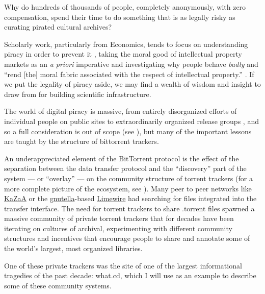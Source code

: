 Why do hundreds of thousands of people, completely anonymously, with
zero compensation, spend their time to do something that is as legally
risky as curating pirated cultural archives?

Scholarly work, particularly from Economics, tends to focus on
understanding piracy in order to prevent it\citep{basamanowiczReleaseGroupsDigital2011, hindujaDeindividuationInternetSoftware2008} , taking the moral good
of intellectual property markets as an \emph{a priori} imperative and
investigating why people behave \emph{badly} and ``rend {[}the{]} moral
fabric associated with the respect of intellectual property.'' \citep{hindujaDeindividuationInternetSoftware2008} . If we put the legality
of piracy aside, we may find a wealth of wisdom and insight to draw from
for building scientific infrastructure.

The world of digital piracy is massive, from entirely disorganized
efforts of individual people on public sites to extraordinarily
organized release groups \citep{basamanowiczReleaseGroupsDigital2011} , and so a full consideration is out of scope (see \citep{eveWarezInfrastructureAesthetics2021} ), but many of the important
lessons are taught by the structure of bittorrent trackers.

An underappreciated element of the BitTorrent protocol is the effect of
the separation between the data transfer protocol and the ``discovery''
part of the system --- or ``overlay'' --- on the community structure of
torrent trackers (for a more complete picture of the ecosystem, see \citep{zhangUnravelingBitTorrentEcosystem2011} ). Many peer to peer
networks like \href{https://en.wikipedia.org/wiki/Kazaa}{KaZaA} or the
\href{https://en.wikipedia.org/wiki/Gnutella}{gnutella}-based
\href{https://en.wikipedia.org/wiki/LimeWire}{Limewire} had searching
for files integrated into the transfer interface. The need for torrent
trackers to share .torrent files spawned a massive community of private
torrent trackers that for decades have been iterating on cultures of
archival, experimenting with different community structures and
incentives that encourage people to share and annotate some of the
world's largest, most organized libraries.

One of these private trackers was the site of one of the largest
informational tragedies of the past decade: what.cd, which I will use
as an example to describe some of these community systems.

